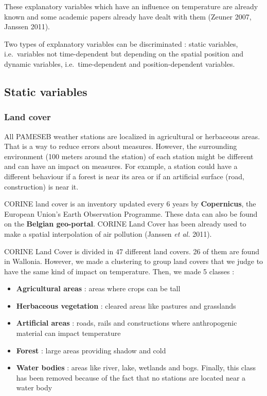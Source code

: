 \documentclass[12pt,twoside]{reedthesis}
\theoremstyle{definition}
\theoremstyle{definition}
\theoremstyle{definition}
\theoremstyle{remark}
\begin{document}
These explanatory variables which have an influence on temperature are
already known and some academic papers already have dealt with them
(Zeuner 2007, Janssen 2011).

Two types of explanatory variables can be discriminated : static
variables, i.e.~variables not time-dependent but depending on the
spatial position and dynamic variables, i.e.~time-dependent and
position-dependent variables.

\subsection{Static variables}\label{static-variables}

\subsubsection{Land cover}\label{land-cover}

All PAMESEB weather stations are localized in agricultural or herbaceous
areas. That is a way to reduce errors about measures. However, the
surrounding environment (100 meters around the station) of each station
might be different and can have an impact on measures. For example, a
station could have a different behaviour if a forest is near its area or
if an artificial surface (road, construction) is near it.

CORINE land cover is an inventory updated every 6 years by
\textbf{Copernicus}, the European Union's Earth Observation Programme.
These data can also be found on the \textbf{Belgian geo-portal}. CORINE
Land Cover has been already used to make a spatial interpolation of air
pollution (Janssen \emph{et al.} 2011).

CORINE Land Cover is divided in 47 different land covers. 26 of them are
found in Wallonia. However, we made a clustering to group land covers
that we judge to have the same kind of impact on temperature. Then, we
made 5 classes :
\begin{itemize}
\item
  \textbf{Agricultural areas} : areas where crops can be tall
\item
  \textbf{Herbaceous vegetation} : cleared areas like pastures and
  grasslands
\item
  \textbf{Artificial areas} : roads, rails and constructions where
  anthropogenic material can impact temperature
\item
  \textbf{Forest} : large areas providing shadow and cold
\item
  \textbf{Water bodies} : areas like river, lake, wetlands and bogs.
  Finally, this class has been removed because of the fact that no
  stations are located near a water body
\end{itemize}
~
\end{document}
